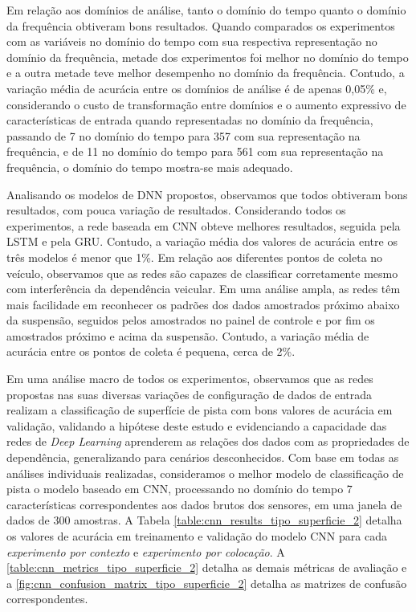 Em relação aos domínios de análise, tanto o domínio do tempo quanto o domínio da frequência obtiveram bons resultados. Quando comparados os experimentos com as variáveis no domínio do tempo com sua respectiva representação no domínio da frequência, metade dos experimentos foi melhor no domínio do tempo e a outra metade teve melhor desempenho no domínio da frequência. Contudo, a variação média de acurácia entre os domínios de análise é de apenas 0,05\% e, considerando o custo de transformação entre domínios e o aumento expressivo de características de entrada quando representadas no domínio da frequência, passando de 7 no domínio do tempo para 357 com sua representação na frequência, e de 11 no domínio do tempo para 561 com sua representação na frequência, o domínio do tempo mostra-se mais adequado.

Analisando os modelos de DNN propostos, observamos que todos obtiveram bons resultados, com pouca variação de resultados. Considerando todos os experimentos, a rede baseada em CNN obteve melhores resultados, seguida pela LSTM e pela GRU. Contudo, a variação média dos valores de acurácia entre os três modelos é menor que 1\%. Em relação aos diferentes pontos de coleta no veículo, observamos que as redes são capazes de classificar corretamente mesmo com interferência da dependência veicular. Em uma análise ampla, as redes têm mais facilidade em reconhecer os padrões dos dados amostrados próximo abaixo da suspensão, seguidos pelos amostrados no painel de controle e por fim os amostrados próximo e acima da suspensão. Contudo, a variação média de acurácia entre os pontos de coleta é pequena, cerca de 2\%.

Em uma análise macro de todos os experimentos, observamos que as redes propostas nas suas diversas variações de configuração de dados de entrada realizam a classificação de superfície de pista com bons valores de acurácia em validação, validando a hipótese deste estudo e evidenciando a capacidade das redes de \textit{Deep Learning} aprenderem as relações dos dados com as propriedades de dependência, generalizando para cenários desconhecidos. Com base em todas as análises individuais realizadas, consideramos o melhor modelo de classificação de pista o modelo baseado em CNN, processando no domínio do tempo 7 características correspondentes aos dados brutos dos sensores, em uma janela de dados de 300 amostras. A Tabela \ref{table:cnn_results_tipo_superficie_2} detalha os valores de acurácia em treinamento e validação do modelo CNN para cada \emph{experimento por contexto} e \emph{experimento por colocação}. A \autoref{table:cnn_metrics_tipo_superficie_2} detalha as demais métricas de avaliação e a \autoref{fig:cnn_confusion_matrix_tipo_superficie_2} detalha as matrizes de confusão correspondentes.


